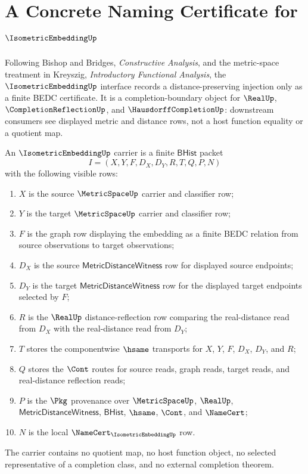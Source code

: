 \chapter{A Concrete Naming Certificate for $\IsometricEmbeddingUp$}
\label{ch:concrete-instances-isometric-embedding-namecert}

Following Bishop and Bridges, \emph{Constructive Analysis}, and the metric-space treatment in Kreyszig, \emph{Introductory Functional Analysis}, the $\IsometricEmbeddingUp$ interface records a distance-preserving injection only as a finite BEDC certificate. It is a completion-boundary object for $\RealUp$, $\CompletionReflectionUp$, and $\HausdorffCompletionUp$: downstream consumers see displayed metric and distance rows, not a host function equality or a quotient map.

\begin{definition}
\label{def:isometric-embedding-carrier}
An $\IsometricEmbeddingUp$ carrier is a finite $\mathsf{BHist}$ packet
$$
I=(X,Y,F,D_X,D_Y,R,T,Q,P,N)
$$
with the following visible rows:
\begin{enumerate}
\item $X$ is the source $\MetricSpaceUp$ carrier and classifier row;
\item $Y$ is the target $\MetricSpaceUp$ carrier and classifier row;
\item $F$ is the graph row displaying the embedding as a finite BEDC relation from source observations to target observations;
\item $D_X$ is the source $\mathsf{MetricDistanceWitness}$ row for displayed source endpoints;
\item $D_Y$ is the target $\mathsf{MetricDistanceWitness}$ row for the displayed target endpoints selected by $F$;
\item $R$ is the $\RealUp$ distance-reflection row comparing the real-distance read from $D_X$ with the real-distance read from $D_Y$;
\item $T$ stores the componentwise $\hsame$ transports for $X$, $Y$, $F$, $D_X$, $D_Y$, and $R$;
\item $Q$ stores the $\Cont$ routes for source reads, graph reads, target reads, and real-distance reflection reads;
\item $P$ is the $\Pkg$ provenance over $\MetricSpaceUp$, $\RealUp$, $\mathsf{MetricDistanceWitness}$, $\mathsf{BHist}$, $\hsame$, $\Cont$, and $\NameCert$;
\item $N$ is the local $\NameCert_{\IsometricEmbeddingUp}$ row.
\end{enumerate}
The carrier contains no quotient map, no host function object, no selected representative of a completion class, and no external completion theorem.
\end{definition}

